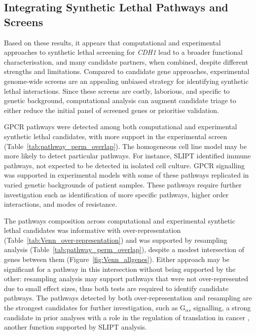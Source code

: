 \subsection{Integrating Synthetic Lethal Pathways and Screens}

Based on these results, it appears that computational and experimental approaches to \gls{synthetic lethal} screening for \textit{CDH1} lead to a broader functional characterisation, and many candidate partners, when combined, despite different strengths and limitations. Compared to candidate gene approaches, experimental \gls{genome}-wide screens are an appealing unbiased strategy for identifying \gls{synthetic lethal} interactions. Since these screens are costly, laborious, and specific to genetic background, computational analysis can augment candidate triage to either reduce the initial panel of screened genes or prioritise validation.

\gls{GPCR} \glspl{pathway} were detected among both computational and experimental \gls{synthetic lethal} candidates, with more support in the experimental screen (Table~\ref{tab:pathway_perm_overlap}). The homogeneous cell line model may be more likely to detect particular \glspl{pathway}. For instance, \gls{SLIPT} identified immune \glspl{pathway}, not expected to be detected in isolated cell culture. \gls{GPCR} signalling was supported in experimental models \cite{Telford2015} with some of these \glspl{pathway} replicated in varied genetic backgrounds of patient samples. These \glspl{pathway} require further investigation such as identification of more specific \glspl{pathway}, higher order interactions, and modes of resistance.

The \glspl{pathway} composition across computational and experimental \gls{synthetic lethal} candidates was informative with over-represent\-ation (Table~\ref{tab:Venn_over-representation}) and was supported by resampling analysis (Table~\ref{tab:pathway_perm_overlap}), despite a modest intersection of genes between them (Figure~\ref{fig:Venn_allgenes}).
Either approach may be significant for a \gls{pathway} in this intersection without being supported by the other: resampling analysis may support \glspl{pathway} that were not over-represent\-ed due to small effect sizes, thus both tests are required to identify candidate \glspl{pathway}.
The \glspl{pathway} detected by both over-represent\-ation and resampling are the strongest candidates for further investigation, such as G$_{\alpha s}$ signalling, a strong candidate in prior analyses with a role in the regulation of translation in cancer \cite{Gao2015}, another function supported by \gls{SLIPT} analysis.

